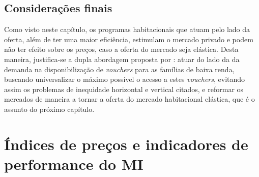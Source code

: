 \documentclass[
	12pt,				%
	oneside,			%
	a4paper,			%
	chapter=TITLE,		%
	section=TITLE,		%
	english,			%
	brazil				%
	]{abntex2}
\begin{document}
\begin{refsection}
\hypertarget{considerauxe7uxf5es-finais-1}{%
\section{Considerações finais}\label{considerauxe7uxf5es-finais-1}}

Como visto neste capítulo, os programas habitacionais que atuam pelo lado
da oferta, além de ter uma maior eficiência, estimulam o mercado privado e podem
não ter efeito sobre os preços, caso a oferta do mercado seja elástica. Desta
maneira, justifica-se a dupla abordagem proposta por
\textcite{malpezzi_affordable_2018_2}: atuar do lado da da demanda na disponibilização de
\emph{vouchers} para as famílias de baixa renda, buscando universalizar o máximo
possível o acesso a estes \emph{vouchers}, evitando assim os problemas de inequidade
horizontal e vertical citados, e reformar os mercados de maneira a tornar a
oferta do mercado habitacional elástica, que é o assunto do próximo capítulo.

\printbibliography[heading=subbibintoc]
\end{refsection}
\hypertarget{indices}{%
\chapter{\texorpdfstring{Índices de preços e indicadores de performance do \gls{MI}}{Índices de preços e indicadores de performance do }}\label{indices}}
\end{document}
